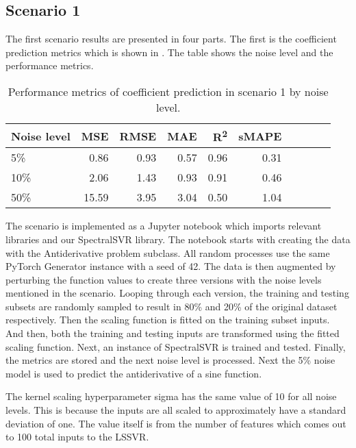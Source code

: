 \subsection{Scenario 1}
\noindent The first scenario results are presented in four parts. The first is the coefficient prediction metrics which is shown in . The table shows the noise level and the performance metrics.
\begin{table}[H]
  \caption{Performance metrics of coefficient prediction in scenario 1 by noise level.}\label{table:scenario_1_spectral_metrics}
  \centering
  \begin{tabular}{lrrrrrrrrr}
    \toprule
    Noise level & MSE   & RMSE & MAE  & R\textsuperscript{2} & sMAPE \\
    \midrule
    5\%         & 0.86  & 0.93 & 0.57 & 0.96                 & 0.31  \\
    10\%        & 2.06  & 1.43 & 0.93 & 0.91                 & 0.46  \\
    50\%        & 15.59 & 3.95 & 3.04 & 0.50                 & 1.04  \\
    \bottomrule
  \end{tabular}
\end{table}

The scenario is implemented as a Jupyter notebook which imports relevant libraries and our SpectralSVR library. The notebook starts with creating the data with the Antiderivative problem subclass. All random processes use the same PyTorch Generator instance with a seed of 42. The data is then augmented by perturbing the function values to create three versions with the noise levels mentioned in the scenario. Looping through each version, the training and testing subsets are randomly sampled to result in 80\% and 20\% of the original dataset respectively. Then the scaling function is fitted on the training subset inputs. And then, both the training and testing inputs are transformed using the fitted scaling function. Next, an instance of SpectralSVR is trained and tested. Finally, the metrics are stored and the next noise level is processed. Next the 5\% noise model is used to predict the antiderivative of a sine function.

The kernel scaling hyperparameter sigma has the same value of 10 for all noise levels. This is because the inputs are all scaled to approximately have a standard deviation of one. The value itself is from the number of features which comes out to 100 total inputs to the LSSVR\@.

